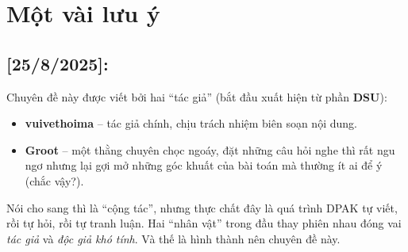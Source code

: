 \section{Một vài lưu ý}
\subsection*{[25/8/2025]: }
Chuyên đề này được viết bởi hai “tác giả” (bắt đầu xuất hiện từ phần \textbf{DSU}):

\begin{itemize}
    \item \textbf{vuivethoima} – tác giả chính, chịu trách nhiệm biên soạn nội dung.
    \item \textbf{Groot} – một thằng chuyên chọc ngoáy, đặt những câu hỏi nghe thì rất ngu ngơ nhưng lại gợi mở những góc khuất của bài toán mà thường ít ai để ý (chắc vậy?).
\end{itemize}

Nói cho sang thì là ``cộng tác'', nhưng thực chất đây là quá trình DPAK tự viết, rồi tự hỏi, rồi tự tranh luận. Hai ``nhân vật'' trong đầu thay phiên nhau đóng vai \textit{tác giả} và \textit{độc giả khó tính}. Và thế là hình thành nên chuyên đề này.
